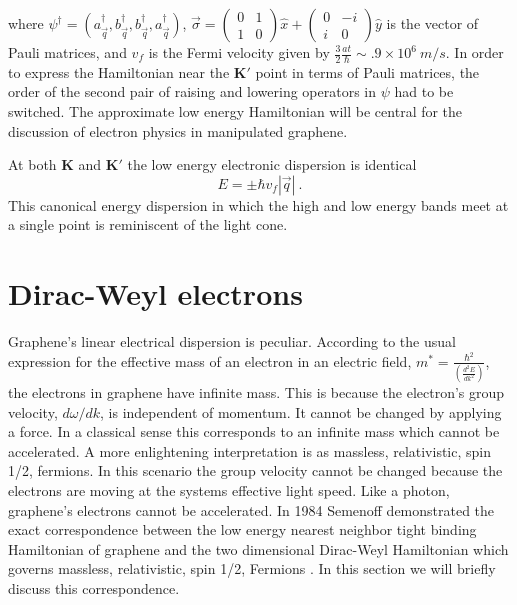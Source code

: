 where $\psi^{\dagger}=(a^{\dagger}_{\vec{q}}, b^{\dagger}_{\vec{q}},  b^{\dagger}_{\vec{q}}, a^{\dagger}_{\vec{q}})$, $\vec{\sigma}= \left( \begin{array}{cc} 0 & 1 \\ 1 & 0 \end{array} \right) \hat{x}+\left( \begin{array}{cc} 0 & -i \\ i & 0 \end{array} \right) \hat{y}$ is the vector of Pauli matrices, and $v_f$ is the Fermi velocity given by $\frac{3}{2}\frac{at}{\hbar} \sim .9 \times 10^6 \ m/s$.
In order to express the Hamiltonian near the $\bm{K'}$ point in terms of Pauli matrices, the order of the second pair of raising and lowering operators in $\psi$ had to be switched.
The approximate low energy Hamiltonian will be central for the discussion of electron physics in manipulated graphene.

At both $\bm{K}$ and $\bm{K'}$ the low energy electronic dispersion is identical
\begin{equation*}
	E=\pm \hbar v_f |\vec{q}| \ .
\end{equation*}
This canonical energy dispersion in which the high and low energy bands meet at a single point is reminiscent of the light cone.

\section{Dirac-Weyl electrons}
Graphene's linear electrical dispersion is peculiar.
According to the usual expression for the effective mass of an electron in an electric field, $m^*=\frac{\hbar^2}{\left(\frac{d^2 E}{d k^2}\right)}$, \cite{Kittel2005} the electrons in graphene have infinite mass.
This is because the electron's group velocity, $d \omega/d k$, is independent of momentum. 
It cannot be changed by applying a force.
In a classical sense this corresponds to an infinite mass which cannot be accelerated.
A more enlightening interpretation is as massless, relativistic, spin 1/2, fermions.
In this scenario the group velocity cannot be changed because the electrons are moving at the systems effective light speed.
Like a photon, graphene's electrons cannot be accelerated.
In 1984 Semenoff demonstrated the exact correspondence between the low energy nearest neighbor tight binding Hamiltonian of graphene and the two dimensional Dirac-Weyl Hamiltonian which governs massless, relativistic, spin 1/2, Fermions \cite{Semenoff1984}.
In this section we will briefly discuss this correspondence.

